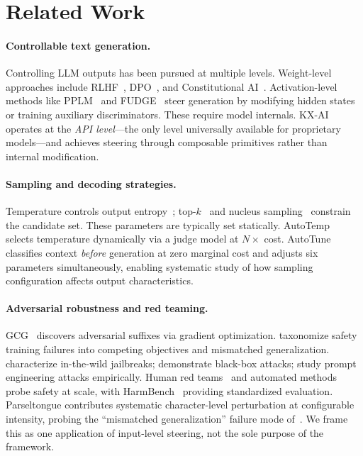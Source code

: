 \documentclass[11pt]{article}
\begin{document}
\section{Related Work}

\paragraph{Controllable text generation.}
Controlling LLM outputs has been pursued at multiple levels. Weight-level approaches include RLHF~\cite{ouyang2022training,stiennon2020learning}, DPO~\cite{rafailov2023direct}, and Constitutional AI~\cite{bai2022constitutional}. Activation-level methods like PPLM~\cite{dathathri2020plug} and FUDGE~\cite{yang2021fudge} steer generation by modifying hidden states or training auxiliary discriminators. These require model internals. KX-AI operates at the \emph{API level}---the only level universally available for proprietary models---and achieves steering through composable primitives rather than internal modification.

\paragraph{Sampling and decoding strategies.}
Temperature controls output entropy~\cite{ackley1985learning}; top-$k$~\cite{fan2018hierarchical} and nucleus sampling~\cite{holtzman2020curious} constrain the candidate set. These parameters are typically set statically. AutoTemp~\cite{plinius2024autotemp} selects temperature dynamically via a judge model at $N\times$ cost. AutoTune classifies context \emph{before} generation at zero marginal cost and adjusts six parameters simultaneously, enabling systematic study of how sampling configuration affects output characteristics.

\paragraph{Adversarial robustness and red teaming.}
GCG~\cite{zou2023universal} discovers adversarial suffixes via gradient optimization. \citet{wei2023jailbroken} taxonomize safety training failures into competing objectives and mismatched generalization. \citet{shen2024anything} characterize in-the-wild jailbreaks; \citet{chao2023jailbreaking} demonstrate black-box attacks; \citet{liu2024jailbreaking} study prompt engineering attacks empirically. Human red teams~\cite{ganguli2022red} and automated methods~\cite{perez2022red} probe safety at scale, with HarmBench~\cite{mazeika2024harmbench} providing standardized evaluation. Parseltongue contributes systematic character-level perturbation at configurable intensity, probing the ``mismatched generalization'' failure mode of~\citet{wei2023jailbroken}. We frame this as one application of input-level steering, not the sole purpose of the framework.
\end{document}
